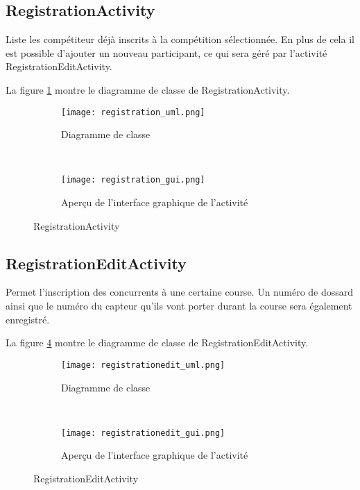 \subsection{RegistrationActivity}

Liste les compétiteur déjà inscrits à la compétition sélectionnée. En plus de cela il est possible d'ajouter un nouveau participant, ce qui sera géré par l'activité RegistrationEditActivity.

La figure \ref{fig:registration_uml} montre le diagramme de classe de RegistrationActivity.

\begin{figure}[htb!]
    \centering
    \begin{subfigure}[htb]{0.49\textwidth}
		\texttt{[image: registration\_uml.png]} 
		\caption{Diagramme de classe}
		\label{fig:registration_uml}
    \end{subfigure}
    ~ %
    \begin{subfigure}[htb]{0.49\textwidth}
		\texttt{[image: registration\_gui.png]} 
		\caption{Aperçu de l'interface graphique de l'activité}
		\label{fig:registration_gui}
    \end{subfigure}
    \caption{RegistrationActivity}\label{fig:registration_fig}
\end{figure}

\subsection{RegistrationEditActivity}

Permet l'inscription des concurrents à une certaine course. Un numéro de dossard ainsi que le numéro du capteur qu'ils vont porter durant la course sera également enregistré.

La figure \ref{fig:registrationedit_uml} montre le diagramme de classe de RegistrationEditActivity.

\begin{figure}[htb!]
    \centering
    \begin{subfigure}[htb]{0.49\textwidth}
		\texttt{[image: registrationedit\_uml.png]} 
		\caption{Diagramme de classe}
		\label{fig:registrationedit_uml}
    \end{subfigure}
    ~ %
    \begin{subfigure}[htb]{0.49\textwidth}
		\texttt{[image: registrationedit\_gui.png]} 
		\caption{Aperçu de l'interface graphique de l'activité}
		\label{fig:registrationedit_gui}
    \end{subfigure}
    \caption{RegistrationEditActivity}\label{fig:registrationedit_fig}
\end{figure}

